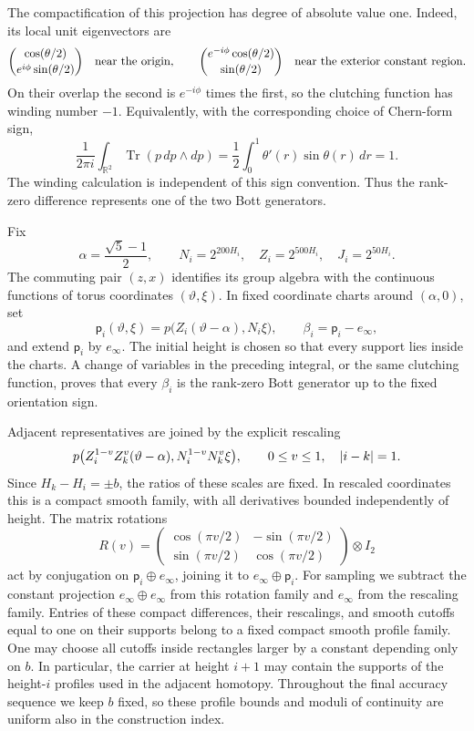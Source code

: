 The compactification of this projection has degree of absolute value one.
Indeed, its local unit eigenvectors are
\[
 \binom{\cos(\theta/2)}{e^{i\phi}\sin(\theta/2)}
 \quad\hbox{near the origin},\qquad
 \binom{e^{-i\phi}\cos(\theta/2)}{\sin(\theta/2)}
 \quad\hbox{near the exterior constant region}.
\]
On their overlap the second is \(e^{-i\phi}\) times the first, so the clutching
function has winding number \(-1\).  Equivalently, with the corresponding
choice of Chern-form sign,
\[
 \frac{1}{2\pi i}\int_{\mathbb R^2}
       \operatorname{Tr}(p\,dp\wedge dp)
 =\frac12\int_0^1\theta'(r)\sin\theta(r)\,dr=1.
\]
The winding calculation is independent of this sign convention.  Thus the
rank-zero difference represents one of the two Bott generators.

Fix
\[
 \alpha=\frac{\sqrt5-1}{2},\qquad
 N_i=2^{200H_i},\quad Z_i=2^{500H_i},\quad J_i=2^{50H_i}.
\]
The commuting pair \((z,x)\) identifies its group algebra with the continuous
functions of torus coordinates \((\vartheta,\xi)\).  In fixed coordinate
charts around \((\alpha,0)\), set
\begin{equation}
\label{eq:scaled-bott-projection}
 \mathsf p_i(\vartheta,\xi)
   =p\bigl(Z_i(\vartheta-\alpha),N_i\xi\bigr),
 \qquad \beta_i=\mathsf p_i-e_\infty,
\end{equation}
and extend \(\mathsf p_i\) by \(e_\infty\).  The initial height is chosen so
that every support lies inside the charts.  A change of variables in the
preceding integral, or the same clutching function, proves that every
\(\beta_i\) is the rank-zero Bott generator up to the fixed orientation sign.

Adjacent representatives are joined by the explicit rescaling
\[
 p\bigl(Z_i^{1-v}Z_k^v(\vartheta-\alpha),
        N_i^{1-v}N_k^v\xi\bigr),\qquad 0\leq v\leq1,
 \quad\left\lvert i-k\right\rvert=1.
\]
Since \(H_k-H_i=\pm b\), the ratios of these scales are fixed.  In rescaled
coordinates this is a compact smooth family, with all derivatives bounded
independently of height.  The matrix rotations
\[
 R(v)=\begin{pmatrix}\cos(\pi v/2)&-\sin(\pi v/2)\\
                      \sin(\pi v/2)& \cos(\pi v/2)\end{pmatrix}
       \otimes I_2
\]
act by conjugation on \(\mathsf p_i\oplus e_\infty\), joining it to
\(e_\infty\oplus\mathsf p_i\).  For sampling we subtract the constant
projection \(e_\infty\oplus e_\infty\) from this rotation family and
\(e_\infty\) from the rescaling family.  Entries of these compact
differences, their rescalings, and smooth cutoffs equal to one on
their supports belong to a fixed compact smooth profile family.  One may
choose all cutoffs inside rectangles larger by a constant depending only on
\(b\).  In particular, the carrier at height \(i+1\) may contain the supports
of the height-\(i\) profiles used in the adjacent homotopy.  Throughout the
final accuracy sequence we keep
\(b\) fixed, so these profile bounds and moduli of continuity are uniform also
in the construction index.

